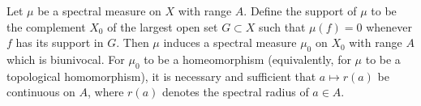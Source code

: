 Let $\mu$ be a spectral measure on $X$ with range $A$. Define the support of $\mu$ to be the complement $X_0$ of the largest open set $G \subset X$ such that $\mu(f) = 0$ whenever $f$ has its support in $G$. Then $\mu$ induces a spectral measure $\mu_0$ on $X_0$ with range $A$ which is biunivocal. For $\mu_0$ to be a homeomorphism (equivalently, for $\mu$ to be a topological homomorphism), it is necessary and sufficient that $a \mapsto r(a)$ be continuous on $A$, where $r(a)$ denotes the spectral radius of $a \in A$.
